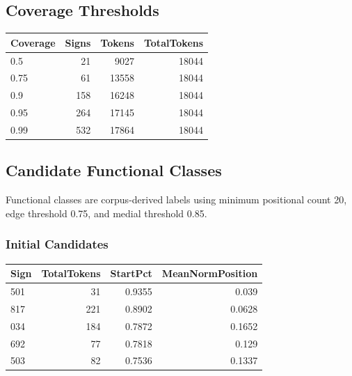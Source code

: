 ﻿\documentclass[11pt,a4paper]{article}
\begin{document}
\subsection*{Coverage Thresholds}
\begin{center}
\begin{tabular}{lrrr}
\toprule
\textbf{Coverage} & \textbf{Signs} & \textbf{Tokens} & \textbf{TotalTokens} \\
\midrule
0.5 & 21 & 9027 & 18044 \\
0.75 & 61 & 13558 & 18044 \\
0.9 & 158 & 16248 & 18044 \\
0.95 & 264 & 17145 & 18044 \\
0.99 & 532 & 17864 & 18044 \\
\bottomrule
\end{tabular}
\end{center}

\subsection*{Candidate Functional Classes}
Functional classes are corpus-derived labels using minimum positional count 20, edge threshold 0.75, and medial threshold 0.85.

\subsubsection*{Initial Candidates}
\begin{center}
\begin{tabular}{lrrr}
\toprule
\textbf{Sign} & \textbf{TotalTokens} & \textbf{StartPct} & \textbf{MeanNormPosition} \\
\midrule
501 & 31 & 0.9355 & 0.039 \\
817 & 221 & 0.8902 & 0.0628 \\
034 & 184 & 0.7872 & 0.1652 \\
692 & 77 & 0.7818 & 0.129 \\
503 & 82 & 0.7536 & 0.1337 \\
\bottomrule
\end{tabular}
\end{center}
\end{document}
